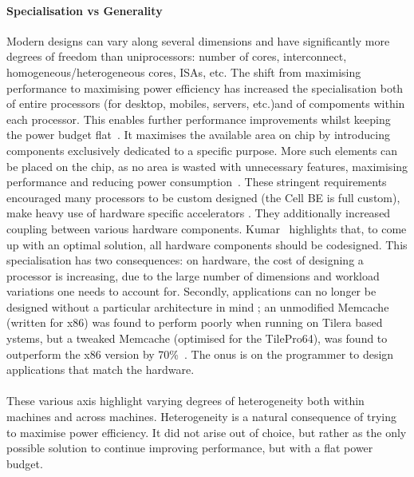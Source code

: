 \paragraph{Specialisation vs Generality} 
 Modern designs can vary along several dimensions and have significantly
more degrees of freedom than uniprocessors: number of cores, interconnect, 
homogeneous/heterogeneous cores, ISAs, etc. The shift from maximising 
performance to maximising power efficiency has increased
the specialisation both of entire processors (for desktop, mobiles,
servers, etc.)and of compoments within each processor. This enables further
performance improvements whilst keeping the power budget flat~\cite{borkar2011future}. It maximises the available area on chip by introducing
components exclusively dedicated to a specific purpose. More
such elements can be placed on the chip, as no area is wasted
with unnecessary features, maximising performance and reducing
power consumption~\cite{borkar2011future}.  
These stringent requirements encouraged many processors to be custom designed
(the Cell BE is full custom), make heavy use of hardware specific accelerators \cite{kahle2005cell}. They additionally increased coupling between various hardware components.
Kumar~\cite{1431574} highlights that, to come up with an optimal solution, all hardware components should be codesigned.  This specialisation has two consequences: 
on hardware, the cost of designing a processor is increasing, due 
to the large number of dimensions and workload variations one needs to account for. 
Secondly, applications can no longer be designed without a particular architecture in mind ; an unmodified Memcache (written for x86) was found to perform poorly when  running on Tilera based ystems, but a tweaked Memcache (optimised for the TilePro64),  was found to outperform the x86 version by 70\%~\cite{berezecki2011manycore}. The onus is on the programmer to design applications that match the hardware.



\paragraph{}  These various axis highlight varying degrees of heterogeneity both within
machines and across machines. Heterogeneity is a natural consequence of 
trying to maximise power efficiency. It did not arise out of choice,  but rather as
the only possible solution to continue improving performance, but with 
a flat power budget. 

